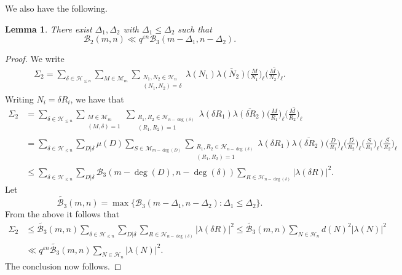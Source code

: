 \documentclass[12pt]{amsart}
\newtheorem{lemma}[theorem]{Lemma}
\def\cM{\mathcal{M}}
\begin{document}
We also have the following. 
\begin{lemma}
\label{lem7}
There exist $\Delta_1, \Delta_2$ with $\Delta_1 \leq \Delta_2$ such that
$$\mathcal{B}_2(m,n) \ll q^{\varepsilon n} \mathcal{B}_3(m-\Delta_1, n-\Delta_2).$$
\end{lemma}
\begin{proof}
We write
\begin{align*}
\Sigma_2 = \sum_{\delta \in \mathcal{H}_{\leq n}} \sum_{M \in \cM_m} \sum_{\substack{N_1,N_2\in \mathcal{H}_n\\ (N_1,N_2)=\delta}} \lambda(N_1) \overline{\lambda(N_2)} \Big(  \frac{M}{N_1} \Big)_{\ell} \overline{ \Big(  \frac{M}{N_2} \Big)_{\ell}}.
\end{align*}
Writing $N_i = \delta R_i$, we have that
\begin{align*}
\Sigma_2 &= \sum_{\delta \in \mathcal{H}_{\leq n}} \sum_{\substack{M \in \cM_m \\ (M,\delta)=1}} \sum_{\substack{R_1,R_2\in \mathcal{H}_{n-\deg(\delta)}\\ (R_1,R_2)=1}} \lambda( \delta R_1) \overline{\lambda(\delta R_2)} \Big(  \frac{M}{R_1} \Big)_{\ell} \overline{ \Big(  \frac{M}{R_2} \Big)_{\ell}} \\
&= \sum_{\delta \in \mathcal{H}_{\leq n}} \sum_{D | \delta} \mu(D) \sum_{S \in \mathcal{M}_{m-\deg(D)}} \sum_{\substack{R_1,R_2\in \mathcal{H}_{n-\deg(\delta)}\\ (R_1,R_2)=1}}  \lambda( \delta R_1) \overline{\lambda(\delta R_2)} \Big(  \frac{D}{R_1} \Big)_{\ell} \overline{ \Big(  \frac{D}{R_2} \Big)_{\ell}} \Big(  \frac{S}{R_1} \Big)_{\ell} \overline{ \Big(  \frac{S}{R_2} \Big)_{\ell}} \\
& \leq \sum_{\delta \in \mathcal{H}_{\leq n}} \sum_{D | \delta} \mathcal{B}_3(m-\deg(D), n - \deg(\delta))\sum_{R\in \mathcal{H}_{n-\deg(\delta)}} |\lambda(\delta R)|^2.
\end{align*}
Let $$\widetilde{\mathcal{B}_3}(m,n) = \max \{ \mathcal{B}_3(m - \Delta_1, n - \Delta_2): \Delta_1 \leq \Delta_2 \}.$$
From the above it follows that
\begin{align*}
\Sigma_2  & \leq \widetilde{\mathcal{B}_3}(m,n) \sum_{\delta \in \mathcal{H}_{\leq n}} \sum_{D|\delta} \sum_{R\in \mathcal{H}_{n-\deg(\delta)}} |\lambda(\delta R)|^2 \leq \widetilde{\mathcal{B}_3}(m,n) \sum_{N\in \mathcal{H}_n} d(N)^2 |\lambda(N)|^2  \\
& \ll q^{\varepsilon n} \widetilde{\mathcal{B}_3}(m,n)\sum_{N\in \mathcal{H}_n}  |\lambda(N)|^2.
\end{align*}
The conclusion now follows.
\end{proof}
\end{document}
